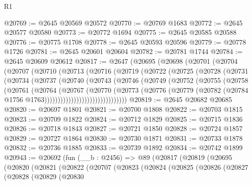 \begin{lexlean}{R1}
\begin{coremodule}
@20769 := @2645 @20569 @20572
@20770 := @20769 @1683
@20772 := @2645 @20577 @20580
@20773 := @20772 @1694
@20775 := @2645 @20585 @20588
@20776 := @20775 @1708
@20778 := @2645 @20593 @20596
@20779 := @20778 @1726
@20781 := @2645 @20601 @20604
@20782 := @20781 @1744
@20784 := @2645 @20609 @20612
@20817 := @2647
    (@20695
      (@20698
        (@20701
          (@20704
            (@20707
              (@20710
                (@20713
                  (@20716
                    (@20719
                      (@20722
                        (@20725
                          (@20728
                            (@20731
                              (@20734
                                (@20737
                                  (@20740
                                    (@20743
                                      (@20746
                                        (@20749
                                          (@20752
                                            (@20755
                                              (@20758
                                                (@20761
                                                  (@20764
                                                    (@20767
                                                      (@20770
                                                        (@20773
                                                          (@20776
                                                            (@20779
                                                              (@20782
                                                                (@20784
                                                                  @1756
                                                                  @1763)))))))))))))))))))))))))))))))
@20819 := @2645 @20682 @20685
@20820 := @20697 @1801
@20821 := @20700 @1808
@20822 := @20703 @1815
@20823 := @20709 @1822
@20824 := @20712 @1829
@20825 := @20715 @1836
@20826 := @20718 @1843
@20827 := @20721 @1850
@20828 := @20724 @1857
@20829 := @20727 @1864
@20830 := @20730 @1871
@20831 := @20733 @1878
@20832 := @20736 @1885
@20833 := @20739 @1892
@20834 := @20742 @1899
@20943 := @20692
    (fun (__b : @2456) =>
    @89
      (@20817
        (@20819
          (@20695
            (@20820
              (@20821
                (@20822
                  (@20707
                    (@20823
                      (@20824
                        (@20825
                          (@20826
                            (@20827
                              (@20828
                                (@20829
                                  (@20830

\end{coremodule}
\end{lexlean}
